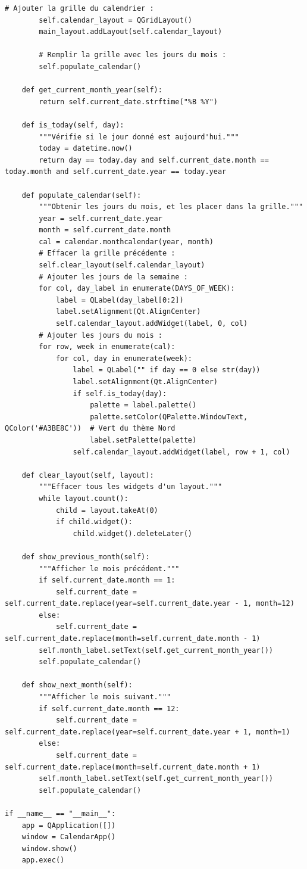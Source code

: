 \begin{lstlisting}[style=python]
        # Ajouter la grille du calendrier :
        self.calendar_layout = QGridLayout()
        main_layout.addLayout(self.calendar_layout)

        # Remplir la grille avec les jours du mois :
        self.populate_calendar()

    def get_current_month_year(self):
        return self.current_date.strftime("%B %Y")

    def is_today(self, day):
        """Vérifie si le jour donné est aujourd'hui."""
        today = datetime.now()
        return day == today.day and self.current_date.month == today.month and self.current_date.year == today.year

    def populate_calendar(self):
        """Obtenir les jours du mois, et les placer dans la grille."""
        year = self.current_date.year
        month = self.current_date.month
        cal = calendar.monthcalendar(year, month)
        # Effacer la grille précédente :
        self.clear_layout(self.calendar_layout)
        # Ajouter les jours de la semaine :
        for col, day_label in enumerate(DAYS_OF_WEEK):
            label = QLabel(day_label[0:2])
            label.setAlignment(Qt.AlignCenter)
            self.calendar_layout.addWidget(label, 0, col)
        # Ajouter les jours du mois :
        for row, week in enumerate(cal):
            for col, day in enumerate(week):
                label = QLabel("" if day == 0 else str(day))
                label.setAlignment(Qt.AlignCenter)
                if self.is_today(day):
                    palette = label.palette()
                    palette.setColor(QPalette.WindowText, QColor('#A3BE8C'))  # Vert du thème Nord
                    label.setPalette(palette)
                self.calendar_layout.addWidget(label, row + 1, col)

    def clear_layout(self, layout):
        """Effacer tous les widgets d'un layout."""
        while layout.count():
            child = layout.takeAt(0)
            if child.widget():
                child.widget().deleteLater()

    def show_previous_month(self):
        """Afficher le mois précédent."""
        if self.current_date.month == 1:
            self.current_date = self.current_date.replace(year=self.current_date.year - 1, month=12)
        else:
            self.current_date = self.current_date.replace(month=self.current_date.month - 1)
        self.month_label.setText(self.get_current_month_year())
        self.populate_calendar()

    def show_next_month(self):
        """Afficher le mois suivant."""
        if self.current_date.month == 12:
            self.current_date = self.current_date.replace(year=self.current_date.year + 1, month=1)
        else:
            self.current_date = self.current_date.replace(month=self.current_date.month + 1)
        self.month_label.setText(self.get_current_month_year())
        self.populate_calendar()

if __name__ == "__main__":
    app = QApplication([])
    window = CalendarApp()
    window.show()
    app.exec()
\end{lstlisting}

